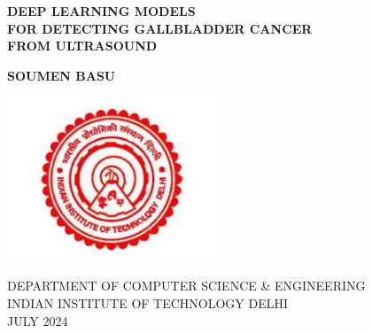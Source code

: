 \begin{titlepage}

\begin{center}


\LARGE 

{\MakeUppercase{\textbf{Deep Learning Models\\ for Detecting Gallbladder Cancer\\ from Ultrasound}}}\\

\vspace{3cm}

\LARGE

\textbf{SOUMEN BASU} 

\vspace{3cm}
\hspace{0cm}
\hbox{\includegraphics[width=15pc]{format/iitd-logo.pdf}}
\vspace{1cm}

\large{DEPARTMENT OF COMPUTER SCIENCE \& ENGINEERING}\\
\large{INDIAN INSTITUTE OF TECHNOLOGY DELHI}\\
\large{JULY 2024}\\

\end{center} 

\end{titlepage}

